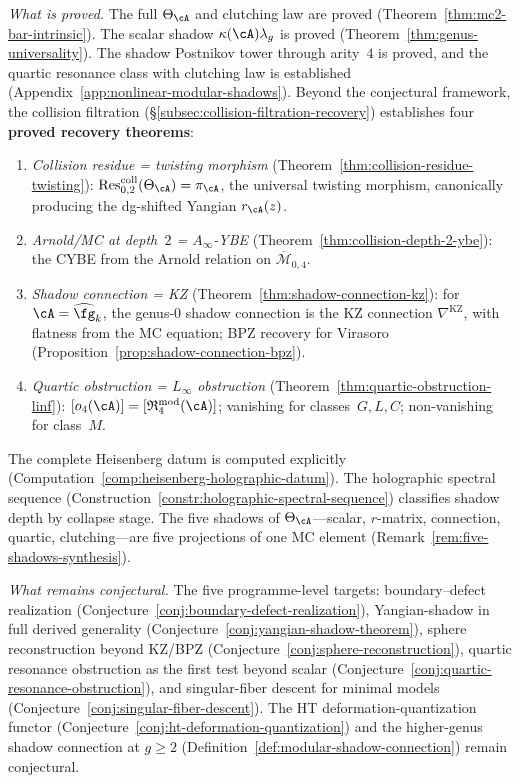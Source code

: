 \noindent\emph{What is proved.}
The full $\Theta_\cA$ and clutching law are proved
(Theorem~\ref{thm:mc2-bar-intrinsic}).  The scalar shadow
$\kappa(\cA)\lambda_g$ is proved (Theorem~\ref{thm:genus-universality}).
The shadow Postnikov tower through arity~$4$ is proved, and the
quartic resonance class with clutching law is established
(Appendix~\ref{app:nonlinear-modular-shadows}).
Beyond the conjectural framework, the collision filtration
(\S\ref{subsec:collision-filtration-recovery}) establishes four
\textbf{proved recovery theorems}:
\begin{enumerate}[label=\textup{(\alph*)}]
\item \emph{Collision residue = twisting morphism}
  (Theorem~\ref{thm:collision-residue-twisting}):
  $\operatorname{Res}^{\mathrm{coll}}_{0,2}(\Theta_\cA) =
  \pi_\cA$, the universal twisting morphism, canonically producing
  the dg-shifted Yangian $r_\cA(z)$.
\item \emph{Arnold/MC at depth~$2$ = $A_\infty$-YBE}
  (Theorem~\ref{thm:collision-depth-2-ybe}): the CYBE from the
  Arnold relation on $\overline{\mathcal{M}}_{0,4}$.
\item \emph{Shadow connection = KZ}
  (Theorem~\ref{thm:shadow-connection-kz}): for
  $\cA = \widehat{\fg}_k$, the genus-$0$ shadow connection is
  the KZ connection $\nabla^{\mathrm{KZ}}$, with flatness
  from the MC equation; BPZ recovery for Virasoro
  (Proposition~\ref{prop:shadow-connection-bpz}).
\item \emph{Quartic obstruction = $L_\infty$ obstruction}
  (Theorem~\ref{thm:quartic-obstruction-linf}):
  $[o_4(\cA)] = [\mathfrak{R}^{\mathrm{mod}}_4(\cA)]$;
  vanishing for classes~$G,L,C$; non-vanishing for class~$M$.
\end{enumerate}
The complete Heisenberg datum is computed explicitly
(Computation~\ref{comp:heisenberg-holographic-datum}).
The holographic spectral sequence
(Construction~\ref{constr:holographic-spectral-sequence})
classifies shadow depth by collapse stage.
The five shadows of $\Theta_\cA$---scalar, $r$-matrix, connection,
quartic, clutching---are five projections of one MC element
(Remark~\ref{rem:five-shadows-synthesis}).

\noindent\emph{What remains conjectural.}
The five programme-level targets:
boundary--defect realization
(Conjecture~\ref{conj:boundary-defect-realization}),
Yangian-shadow in full derived generality
(Conjecture~\ref{conj:yangian-shadow-theorem}),
sphere reconstruction beyond KZ/BPZ
(Conjecture~\ref{conj:sphere-reconstruction}),
quartic resonance obstruction as the first test beyond scalar
(Conjecture~\ref{conj:quartic-resonance-obstruction}), and
singular-fiber descent for minimal models
(Conjecture~\ref{conj:singular-fiber-descent}).
The HT deformation-quantization functor
(Conjecture~\ref{conj:ht-deformation-quantization}) and the
higher-genus shadow connection at $g \geq 2$
(Definition~\ref{def:modular-shadow-connection}) remain
conjectural.


